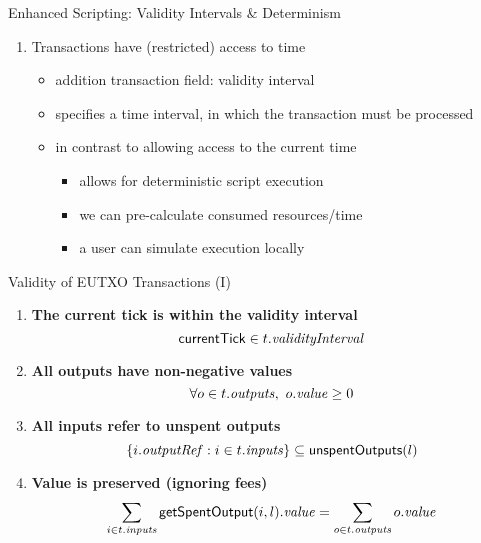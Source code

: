 \begin{frame}{Enhanced Scripting: Validity Intervals \& Determinism}

\begin{enumerate}
\conti
\item Transactions have (restricted) access to time
  \begin{itemize}
  \item addition transaction field: \alert{validity interval}
  \item specifies a time interval, in which the transaction must be processed
  \item in contrast to allowing access to the current time
    \begin{itemize}
    \item allows for \alert{deterministic} script execution
    \item we can pre-calculate consumed resources/time
    \item a user can simulate execution locally
    \end{itemize}
  \end{itemize}
\end{enumerate}

\end{frame}

\begin{frame}{Validity of EUTXO Transactions (I)}

\begin{enumerate}
\item
  \label{rule:tick-in-range}
  \textbf{The current tick is within the validity interval}
  \begin{displaymath}
    \mathsf{currentTick} \in t.\mathit{validityInterval}
  \end{displaymath}

\item
  \label{rule:all-outputs-are-non-negative}
  \textbf{All outputs have non-negative values}
  \begin{displaymath}
    \forall o \in t.\mathit{outputs},\ o.\mathit{value} \geq 0
  \end{displaymath}

\item
  \label{rule:all-inputs-refer-to-unspent-outputs}
  \textbf{All inputs refer to unspent outputs}
  \begin{displaymath}
    \{i.\mathit{outputRef} : i \in t.\mathit{inputs} \} \subseteq \mathsf{unspentOutputs}(l)
  \end{displaymath}

\item
  \label{rule:value-is-preserved}
  \textbf{Value is preserved (ignoring fees)}
  \begin{displaymath}
    \sum_{i \in t.\mathit{inputs}} \mathsf{getSpentOutput}(i, l).\mathit{value} = \sum_{o \in t.\mathit{outputs}} o.\mathit{value}
  \end{displaymath}

\seti
\end{enumerate}

\end{frame}

